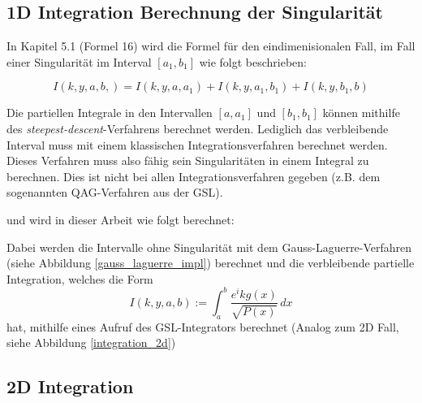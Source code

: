 \begin{center}
    
    \label{gauss_laguerre_impl}
\end{center}


\subsection{1D Integration Berechnung der Singularität}

In Kapitel 5.1 \cite[12]{gasperini:hal-03209144} (Formel 16) wird die Formel für den eindimenisionalen Fall, im Fall einer Singularität im Interval $[a_1, b_1]$ wie folgt beschrieben:

\begin{equation}
    I(k,y,a,b,) = I(k,y,a,a_1) + I(k,y,a_1, b_1) + I(k,y,b_1,b)
\end{equation}

Die partiellen Integrale in den Intervallen $[a,a_1]$ und  $[b_1,b_1]$ können mithilfe des \textit{steepest-descent}-Verfahrens berechnet werden.
Lediglich das verbleibende Interval muss mit einem klassischen Integrationsverfahren berechnet werden.
Dieses Verfahren muss also fähig sein Singularitäten in einem Integral zu berechnen. Dies ist nicht bei allen Integrationsverfahren gegeben (z.B. dem sogenannten QAG-Verfahren aus der GSL).

und wird in dieser Arbeit wie folgt berechnet:
\begin{center}
    
\end{center}

Dabei werden die Intervalle ohne Singularität mit dem Gauss-Laguerre-Verfahren (siehe Abbildung \ref{gauss_laguerre_impl}) berechnet und die verbleibende partielle Integration,
welches die Form
\begin{equation*}
    I(k,y,a,b) := \int_{a}^{b}  \frac{e^ikg(x)}{\sqrt{P(x)}} \,dx 
\end{equation*}
hat, mithilfe eines Aufruf des GSL-Integrators berechnet (Analog zum 2D Fall, siehe Abbildung \ref{integration_2d})



\subsection{2D Integration}\label{2dint}

